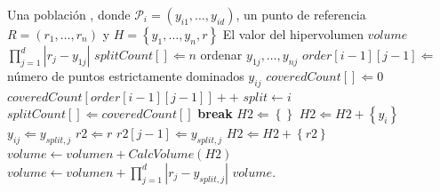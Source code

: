   \begin{algorithm}
  \begin{algorithmic}[1]
	\REQUIRE Una poblaci\'on \DIFdelbegin {}\DIFdelend \DIFaddbegin {}\DIFaddend , donde $\mathcal{P}_i = \left(y_{i 1},\ldots,y_{i d}\right) $, 
	un punto de referencia $R=\left(r_1,\ldots,r_n\right)$ y $H =\left\{y_1,\ldots,y_n, r\right\}$
	\ENSURE El valor del hipervolumen $volume$
		\RETURN $\prod^{d}_{j=1}\left|r_j - y_ {1 j}\right|$
	\ENDIF
	\STATE \DIFdelbegin {}\DIFdelend \DIFaddbegin {}\DIFaddend \STATE $splitCount\left[\right]\Leftarrow n$
		\STATE ordenar $y_{1j},\ldots,y_{nj}$
			\STATE $order\left[i-1\right]\left[j-1\right]\Leftarrow$ n\'umero de puntos 
			estrictamente dominados $y_{ij}$ 
		\ENDFOR
	\ENDFOR
	\DIFdelbegin %
\DIFdelend \DIFaddbegin {}
			\DIFaddend \STATE $coveredCount\left[\right]\Leftarrow 0$
				\STATE $coveredCount\left[order\left[i-1\right]\left[j-1\right]\right]++$			
			\ENDFOR
			\DIFdelbegin %
\DIFdelend \DIFaddbegin {}
				\DIFaddend {}
					\STATE $split \leftarrow i$
					\STATE $splitCount\left[\right]\Leftarrow coveredCount\left[\right]$
					\STATE \textbf{break}					
				\ENDIF				
			\ENDFOR
	\ENDFOR
	\DIFdelbegin %
\DIFdelend \DIFaddbegin {}
		\DIFaddend {}
			\STATE $H2\Leftarrow\left\{\right\}$
					\STATE $H2\Leftarrow H2+\left\{y_i\right\}$
					\STATE $y_{ij} \Leftarrow y_{split,j}$
				\ENDIF				
			\ENDFOR
			\STATE $r2\Leftarrow r$
			\STATE $r2\left[j-1\right]\Leftarrow  y_{split,j}$
			\STATE $H2\Leftarrow H2 + \left\{r2\right\}$
			\STATE $volume \leftarrow volumen + CalcVolume\left(H2\right)$
		\ENDIF
	\ENDFOR
	\STATE $volume \leftarrow volumen + \prod^{d}_{j=1}\left|r_j - y_ {split,j}\right|$
	\RETURN $volume$.
\end{algorithmic}
\caption{$CalcVolume\left(H\right)$}
\label{alg:hv}
\end{algorithm}

